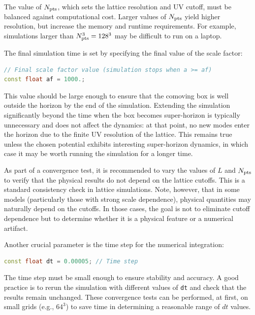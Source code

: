 \documentclass[aps, nofootinbib,superscriptaddress, preprintnumbers, longbibliography]{article}
\begin{document}
The value of $N_{\rm pts}$, which sets the lattice resolution and UV cutoff, must be balanced against computational cost. Larger values of $N_{\rm pts}$ yield higher resolution, but increase the memory and runtime requirements. For example, simulations larger than $N^3_{\rm pts} = 128^3$ may be difficult to run on a laptop.

The final simulation time is set by specifying the final value of the scale factor:
\begin{lstlisting}[language=C++, firstnumber=25,caption={}]
// Final scale factor value (simulation stops when a >= af)
const float af = 1000.;
\end{lstlisting}
This value should be large enough to ensure that the comoving box is well outside the horizon by the end of the simulation. Extending the simulation significantly beyond the time when the box becomes super-horizon is typically unnecessary and does not affect the dynamics: at that point, no new modes enter the horizon due to the finite UV resolution of the lattice. This remains true unless the chosen potential exhibits interesting super-horizon dynamics, in which case it may be worth running the simulation for a longer time.

As part of a convergence test, it is recommended to vary the values of $L$ and $N_{\rm pts}$ to verify that the physical results do not depend on the lattice cutoffs. This is a standard consistency check in lattice simulations. Note, however, that in some models (particularly those with strong scale dependence), physical quantities may naturally depend on the cutoffs. In those cases, the goal is not to eliminate cutoff dependence but to determine whether it is a physical feature or a numerical artifact.

Another crucial parameter is the time step for the numerical integration:

\begin{lstlisting}[language=C++, firstnumber=60,caption={}]
const float dt = 0.00005; // Time step
\end{lstlisting}

The time step must be small enough to ensure stability and accuracy. A good practice is to rerun the simulation with different values of \texttt{dt} and check that the results remain unchanged. These convergence tests can be performed, at first, on small grids (e.g., $64^3$) to save time in determining a reasonable range of $dt$ values.
\end{document}
